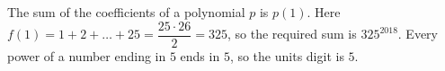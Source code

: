 The sum of the coefficients of a polynomial $p$ is $p(1)$. Here $f(1)=1+2+\dots+25=\dfrac{25\cdot26}{2}=325$, so the required sum is $325^{2018}$. Every power of a number ending in $5$ ends in $5$, so the units digit is $\boxed{5}$.
